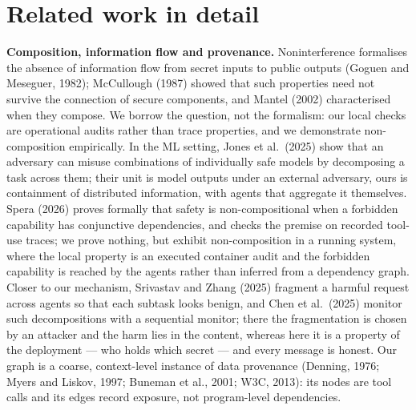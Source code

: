 \documentclass[11pt, a4paper]{article}
\begin{document}
\section{Related work in detail}
\label{app:related}

\textbf{Composition, information flow and provenance.} Noninterference formalises the absence of information flow from secret inputs to public outputs (Goguen and Meseguer, 1982); McCullough (1987) showed that such properties need not survive the connection of secure components, and Mantel (2002) characterised when they compose. We borrow the question, not the formalism: our local checks are operational audits rather than trace properties, and we demonstrate non-composition empirically. In the ML setting, Jones et al.\ (2025) show that an adversary can misuse combinations of individually safe models by decomposing a task across them; their unit is model outputs under an external adversary, ours is containment of distributed information, with agents that aggregate it themselves. Spera (2026) proves formally that safety is non-compositional when a forbidden capability has conjunctive dependencies, and checks the premise on recorded tool-use traces; we prove nothing, but exhibit non-composition in a running system, where the local property is an executed container audit and the forbidden capability is reached by the agents rather than inferred from a dependency graph. Closer to our mechanism, Srivastav and Zhang (2025) fragment a harmful request across agents so that each subtask looks benign, and Chen et al.\ (2025) monitor such decompositions with a sequential monitor; there the fragmentation is chosen by an attacker and the harm lies in the content, whereas here it is a property of the deployment --- who holds which secret --- and every message is honest. Our graph is a coarse, context-level instance of data provenance (Denning, 1976; Myers and Liskov, 1997; Buneman et al., 2001; W3C, 2013): its nodes are tool calls and its edges record exposure, not program-level dependencies.
\end{document}
